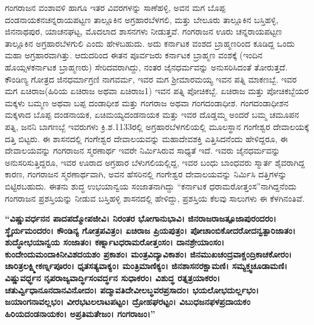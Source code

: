 ಗಂಗರಾಜನ ವಂಶಾವಳಿ ಹಾಗೂ ಇತರ ವಿವರಗಳನ್ನು ಸಾಣೆಹಳ್ಳಿ, ಅವನ ಮಗ ಬೊಪ್ಪ ದಂಡನಾಯಕನ\break ಚನ್ನರಾಯಪಟ್ಟಣ ತಾಲ್ಲೂಕಿನ ಅಗ್ರಹಾರಬೆಳಗಲಿ, ಮತ್ತು ಬೇಲೂರು ತಾಲ್ಲೂಕಿನ ಬಸ್ತಿಹಳ್ಳಿ, ಜಿನನಾಥಪುರ, ಯಾಚನಘಟ್ಟ, ಮೊದಲಾದ ಶಾಸನಗಳು ನೀಡುತ್ತವೆ. ಗಂಗರಾಜನ ಊರು ಚನ್ನರಾಯಪಟ್ಟಣ ತಾಲ್ಲೂಕಿನ ಅಗ್ರಹಾರ\-ಬೆಳಗುಲಿ ಎಂದು ಹೇಳಬಹುದು. ಅದು ಕರ್ನಾಟಕ ವಂಶದ ಬ್ರಾಹ್ಮಣರಿಂದ ಕೂಡಿದ್ದ ಒಂದು ಮಹಾ ಅಗ್ರಹಾರವಾಗಿತ್ತು. ಆದುದರಿಂದ ಈತನ ಪೂರ್ವಜರು ಕರ್ನಾಟಕ ಬ್ರಾಹ್ಮಣ ವಂಶಕ್ಕೆ (ಇಂದಿನ ಹೊಯ್ಸಳಕರ್ನಾಟಕ ಬ್ರಾಹ್ಮಣರು) ಸೇರಿದವರಾಗಿದ್ದು, ನಂತರ ಜೈನಧರ್ಮವನ್ನು ಅನುಸರಿಸಿದಂತೆ ತೋರುತ್ತದೆ. ಕೌಂಡಿಣ್ಯ ಗೋತ್ರದ ಜಿನಧರ್ಮಾಗ್ರಣಿ ನಾಗವರ್ಮ, ಇವರ ಮಗ ಶ‍್ರೀಮಾರಮಯ್ಯ ಇವನ ಪತ್ನಿ ಮಾಕಣಬ್ಬೆ. ಇವರ ಮಗ ಏಚಿರಾಜ(ಹಿರಿಯ ಏಚಿರಾಜ ಅಥವಾ ಏಚಿರಾಜ\enginline{-}1) ಇವನ ಪತ್ನಿ ಪೋಚಿಕಬ್ಬೆ. ಏಚಿರಾಜ ಮತ್ತು ಪೋಚಿಕಬ್ಬೆಯರ ಮಕ್ಕಳು ಬಮ್ಮಣ ಅಥವಾ ಬಪ್ಪ ದಂಡಾಧೀಶ ಮತ್ತು ಗಂಗರಾಜ ಅಥವಾ ಗಂಗದಂಡಾಧೀಶ. ಗಂಗದಂಡಾಧೀಶನ ಮಕ್ಕಳಾದ ಬೊಪ್ಪ ದಂಡನಾಯಕ, ಏಚಿಮಯ್ಯದಂಡನಾಯಕ ಮತ್ತು ಇವರ ದೊಡ್ಡಮ್ಮ ಅಂದರೆ ಬಮ್ಮ ಚಮೂಪನ ಪತ್ನಿ, ಜನನಿ ಬಾಗಣಬ್ಬೆ ಇವರುಗಳು ಕ್ರಿ.ಶ.1133ರಲ್ಲಿ ಅಗ್ರಹಾರಬೆಳಗಲಿಯಲ್ಲಿ ಮೂಲಸ್ಥಾನ ಗಂಗೇಶ್ವರ ದೇವಾಲಯಕ್ಕೆ ದತ್ತಿ ಬಿಟ್ಟರು. ಈ ಶಾಸನದಲ್ಲಿ ಗಂಗೇಶ್ವರ ದೇವಾಲಯವನ್ನು ಮಹಾದೇವಶಕ್ತಿ ಎತ್ತಿಸಿದನೆಂದು ಹೇಳಿದ್ದರೂ, ಈ ದೇವಾಲಯವನ್ನು ಗಂಗರಾಜನ ಸ್ಮರಣಾರ್ಥ ಇವರೇ ನಿರ್ಮಿಸಿರುವ ಸಾಧ್ಯತೆ ಇದೆ. ಇವರು ಜೈನಧರ್ಮವನ್ನು ಅನುಸರಿಸುತ್ತಿದ್ದರೂ, ಇವರ ಊರಾದ ಅಗ್ರಹಾರ ಬೆಳುಗಲಿಯಲ್ಲಿದ್ದ, ಇವರ ಬಂಧು ಬಾಂಧವರು ಸ್ಮಾರ್ತ ಶೈವರಾಗಿದ್ದ ಕಾರಣ, ಗಂಗರಾಜನ ಸ್ಮರಣಾರ್ಥವಾಗಿ, ಅವನ ಹೆಸರಿನಲ್ಲಿ ಗಂಗೇಶ್ವರ ದೇವಾಲಯವನ್ನು ನಿರ್ಮಿಸಿ ದತ್ತಿಗಳನ್ನು ಬಿಟ್ಟಿರಬಹುದು. ಈತನು ಶುದ್ಧ ಉಭಯಾನ್ವಯ ಸಂಜಾತನಾಗಿದ್ದು “ಕರ್ನಾಟಕ ಧರಾಮರೋತ್ತಂಸ”ನಾಗಿದ್ದನೆಂದು ಗಂಗರಾಜನ ಪ್ರಶಸ್ತಿಯನ್ನು ನೀಡುವ ಬಸ್ತಿಹಳ್ಳಿ ಶಾಸನದಲ್ಲಿ ಹೇಳಿದ್ದು, ಪ್ರಶಸ್ತಿಯ ಕೆಲವು ಸಾಲುಗಳು ಈ ಕೆಳಗಿನಂತಿವೆ.

\textbf{“ವಿಷ್ಣುವರ್ಧನನ ಪಾದಪದ್ಮೋಪಜೀವಿ। ನಿರಂತರ ಭೋಗಾನುಭಾವಿ। ಜಿನರಾಜರಾಜತ್ಪೂಜಾಪುರಂದರಂ।\general{\break } ಸ್ಥೈರ್ಯಮಂದರಂ। ಕೌಂಡಿನ್ಯ ಗೋತ್ರಪವಿತ್ರಂ। ಏಚಿರಾಜ ಪ್ರಿಯಪುತ್ರಂ। ಪೋಚಾಂಬಿಕೋದರೋದನ್ವತ್ಪಾರಿಜಾತಂ।\general{\break } ಶುದ್ಧೋಭಯಾನ್ವಯ ಸಂಜಾತಂ। ಕರ್ಣ್ನಾಟಧರಾಮರೋತ್ತಂಸಂ। ದಾನಶ್ರೇಯಾಂಸಂ। ಕುಂದೇಂದುಮಂದಾಕಿನೀವಿಶದಯಶಂ ಪ್ರಕಾಶಂ। ಮಂತ್ರವಿದ್ಯಾವಿಕಾಶಂ। ಜಿನಮುಖಚಂದ್ರವಾಕ್ಚಂದ್ರಿಕಾಚಕೋರಂ। ಚಾರಿತ್ರಲಕ್ಷ್ಮೀಕರ್ಣ್ನಪೂರಂ। ಧೃತಸತ್ಯವಾಕ್ಯಂ। ಮಂತ್ರಿಮಾಣಿಕ್ಯಂ। ಜಿನಶಾಸನರಕ್ಷಾಮಣಿ। ಸಮ್ಯಕ್ತ್ವಚೂಡಾಮಣಿ। ವಿಷ್ಣುವರ್ಧ್ಧನ ನೃಪರಾಜ್ಯವಾರ್ದ್ಧಿಸಂವರ್ದ್ಧನ ಸುಧಾಕರಂ। ವಿಶುದ್ಧ ರತ್ನತ್ರಯಾಕರಂ। ಚತುರ್ವ್ವಿಧಾನೂನದಾನವಿನೋದಂ। ಪದ್ಮಾವತಿದೇವೀಲಬ್ಧವರಪ್ರಸಾದಂ। ಭಯಲೋಭದುರ್ಲ್ಲಭಂ। ಜಯಾಂಗನಾವಲ್ಲಭಂ। ವೀರಭಟಲಲಾಟಪಟ್ಟಂ। ದ್ರೋಹಘರಟ್ಟಂ। ವಿಬುಧಜನಫಳಪ್ರದಾಯಕಂ ಹಿರಿಯದಂಡನಾಯಕಂ। ಅಪ್ರತಿಮತೇಜಂ। ಗಂಗರಾಜಂ।”}


